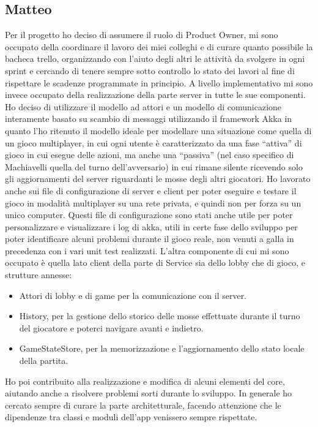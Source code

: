 \subsection{Matteo}
Per il progetto ho deciso di assumere il ruolo di Product Owner, mi sono occupato della coordinare il lavoro dei miei colleghi e di curare quanto possibile la bacheca trello, organizzando con l’aiuto degli altri le attività da svolgere in ogni sprint e cercando di tenere sempre sotto controllo lo stato dei lavori al fine di rispettare le scadenze programmate in principio.
A livello implementativo mi sono invece occupato della realizzazione della parte server in tutte le sue componenti.
Ho deciso di utilizzare il modello ad attori e un modello di comunicazione interamente basato su scambio di messaggi utilizzando il framework Akka in quanto l’ho ritenuto il modello ideale per modellare una situazione come quella di un gioco multiplayer, in cui ogni utente è caratterizzato da una fase “attiva” di gioco in cui esegue delle azioni, ma anche una “passiva” (nel caso specifico di Machiavelli quella del turno dell’avversario) in cui rimane silente ricevendo solo gli aggiornamenti del server riguardanti le mosse degli altri giocatori.
Ho lavorato anche sui file di configurazione di server e client per poter eseguire e testare il gioco in modalità multiplayer su una rete privata, e quindi non per forza su un unico computer.
Questi file di configurazione sono stati anche utile per poter personalizzare e visualizzare i log di akka, utili in certe fase dello sviluppo per poter identificare alcuni problemi durante il gioco reale, non venuti a galla in precedenza con i vari unit test realizzati.
L’altra componente di cui mi sono occupato è quella lato client della parte di Service sia dello lobby che di gioco, e strutture annesse:
\begin{itemize}
    \item Attori di lobby e di game per la comunicazione con il server.
    \item History, per la gestione dello storico delle mosse effettuate durante il turno del giocatore e poterci navigare avanti e indietro.
    \item GameStateStore, per la memorizzazione e l’aggiornamento dello stato locale della partita.
\end{itemize}
Ho poi contribuito alla realizzazione e modifica di alcuni elementi del core, aiutando anche a risolvere problemi sorti durante lo sviluppo.
In generale ho cercato sempre di curare la parte architetturale, facendo attenzione che le dipendenze tra classi e moduli dell’app venissero sempre rispettate.
